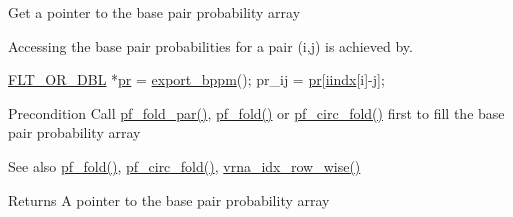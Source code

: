Get a pointer to the base pair probability array

Accessing the base pair probabilities for a pair (i,j) is achieved by. 


\begin{DoxyCode}
\mbox{\hyperlink{group__data__structures_ga31125aeace516926bf7f251f759b6126}{FLT\_OR\_DBL}} *\mbox{\hyperlink{fold__vars_8h_ac98ec419070aee6831b44e5c700f090f}{pr}}  = \mbox{\hyperlink{group__pf__fold_gac5ac7ee281aae1c5cc5898a841178073}{export\_bppm}}();
pr\_ij           = \mbox{\hyperlink{fold__vars_8h_ac98ec419070aee6831b44e5c700f090f}{pr}}[\mbox{\hyperlink{fold__vars_8h_a92089ae3a51b5d75a14ce9cc29cc8317}{iindx}}[i]-j];
\end{DoxyCode}


\begin{DoxyPrecond}{Precondition}
Call \mbox{\hyperlink{group__pf__fold_gac4f95bee734b2563a3d6e9932117ebdf}{pf\+\_\+fold\+\_\+par()}}, \mbox{\hyperlink{group__pf__fold_gadc3db3d98742427e7001a7fd36ef28c2}{pf\+\_\+fold()}} or \mbox{\hyperlink{group__pf__fold_ga819ce5fca8984004ac81c4a3b04cb735}{pf\+\_\+circ\+\_\+fold()}} first to fill the base pair probability array
\end{DoxyPrecond}
\begin{DoxySeeAlso}{See also}
\mbox{\hyperlink{group__pf__fold_gadc3db3d98742427e7001a7fd36ef28c2}{pf\+\_\+fold()}}, \mbox{\hyperlink{group__pf__fold_ga819ce5fca8984004ac81c4a3b04cb735}{pf\+\_\+circ\+\_\+fold()}}, \mbox{\hyperlink{group__utils_ga70b180e9ea764218a82647a1cd347445}{vrna\+\_\+idx\+\_\+row\+\_\+wise()}}
\end{DoxySeeAlso}
\begin{DoxyReturn}{Returns}
A pointer to the base pair probability array 
\end{DoxyReturn}
\mbox{\label{group__pf__fold_ga42faebdfce6f070c5f89adfc8427525c}} 
